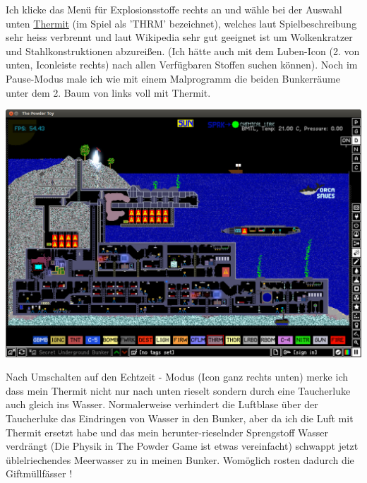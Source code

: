 \begin{multicols}{2}
Ich klicke das Menü für Explosionsstoffe rechts an und wähle bei der Auswahl unten \href{https://de.wikipedia.org/wiki/Thermit}{Thermit} (im Spiel als 'THRM' bezeichnet), welches laut Spielbeschreibung sehr heiss verbrennt und laut Wikipedia sehr gut geeignet ist um Wolkenkratzer und Stahlkonstruktionen abzureißen. (Ich hätte auch mit dem Luben-Icon (2. von unten, Iconleiste rechts) nach allen Verfügbaren Stoffen suchen können). Noch im Pause-Modus male ich wie mit einem Malprogramm die beiden Bunkerräume unter dem 2. Baum von links voll mit Thermit.
\begin{center}
\includegraphics[width=\linewidth]{powdertoy/powdertoy-bu2.png}
\end{center}
Nach Umschalten auf den Echtzeit - Modus (Icon ganz rechts unten) merke ich dass mein Thermit nicht nur nach unten rieselt sondern durch eine Taucherluke auch gleich ins Wasser. Normalerweise verhindert die Luftblase über der Taucherluke das Eindringen von Wasser in den Bunker, aber da ich die Luft mit Thermit ersetzt habe und das mein herunter-rieselnder Sprengstoff Wasser verdrängt (Die Physik in The Powder Game ist etwas vereinfacht) schwappt jetzt üblelriechendes Meerwasser zu in meinen Bunker. Womöglich rosten dadurch die Giftmüllfässer ! 


\end{multicols}
